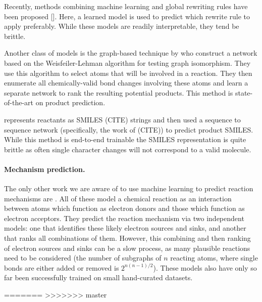 Recently, methods combining machine learning and global rewriting rules have been proposed [\cite{coley2017prediction,neural-symbolic,segler2018planning,wei2016neural,zhang2005structure}]. Here, a learned model is used to predict which rewrite rule to apply preferably. While these models are readily interpretable, they tend be brittle. 

Another class of models is the graph-based technique by \cite{jin2017predicting} who construct a network based on the Weisfeiler-Lehman algorithm for testing graph isomorphism. They use this algorithm to select atoms that will be involved in a reaction. They then enumerate all chemically-valid bond changes involving these atoms and learn a separate network to rank the resulting potential products. This method is state-of-the-art on product prediction.

\cite{schwaller2017found} represents reactants as SMILES (CITE) strings and then used a sequence to sequence network (specifically, the work of (CITE)) to predict product SMILES. While this method is end-to-end trainable the SMILES representation is quite brittle as often single character changes will not correspond to a valid molecule.

\paragraph{Mechanism prediction.}
The only other work we are aware of to use machine learning to predict reaction mechanisms are \cite{fooshee2018deep,kayala2012reactionpredictor,NIPS2011_4356,kayala2011learning}.
All of these model a chemical reaction as an interaction between atoms which function as electron donors and those which function as electron acceptors. They predict the reaction mechanism via two independent models: one that identifies these likely electron sources and sinks, and another that ranks all combinations of them.
However, this combining and then ranking of electron sources and sinks can be a slow process, as many plausible reactions need to be considered (the number of subgraphs of $n$ reacting atoms, where single bonds are either added or removed is $2^{n(n-1)/2}$).
These models also have only so far been successfully trained on small hand-curated datasets.

=======
>>>>>>> master
